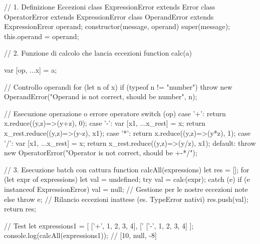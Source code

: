 \begin{jsbox}[title={Codice Completo: calc e calcAll}]
// 1. Definizione Eccezioni
class ExpressionError extends Error {}
class OperatorError extends ExpressionError {}
class OperandError extends ExpressionError {
  operand;
  constructor(message, operand) {
    super(message);
    this.operand = operand;
  }
}

// 2. Funzione di calcolo che lancia eccezioni
function calc(a) {
  var [op, ...x] = a;
  
  // Controllo operandi
  for (let n of x) {
    if (typeof n != "number") {
      throw new OperandError("Operand is not correct, should be number", n);
    }
  }

  // Esecuzione operazione o errore operatore
  switch (op) {
    case '+': return x.reduce((y,z)=>(y+z), 0);
    case '-': 
      var [x1, ...x_rest] = x;
      return x_rest.reduce((y,z)=>(y-z), x1);
    case '*': return x.reduce((y,z)=>(y*z), 1);
    case '/': 
      var [x1, ...x_rest] = x;
      return x_rest.reduce((y,z)=>(y/z), x1);
    default:
      throw new OperatorError("Operator is not correct, should be +-*/");
  }
}

// 3. Esecuzione batch con cattura
function calcAll(expressions) {
  let res = [];
  for (let expr of expressions) {
    let val = undefined;
    try {
      val = calc(expr);
    } catch (e) {
      if (e instanceof ExpressionError) {
        val = null; // Gestione per le nostre eccezioni note
      } else {
        throw e;    // Rilancio eccezioni inattese (es. TypeError nativi)
      }
    }
    res.push(val);
  }
  return res;
}

// Test
let expressions1 = [
  ['+', 1, 2, 3, 4],
  ['%
  ['-', 1, 2, 3, 4]
];
console.log(calcAll(expressions1)); // [10, null, -8]
\end{jsbox}
